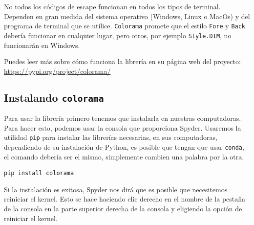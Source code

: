 \documentclass[10pt,a4paper]{article}
\begin{document}
No todos los códigos de escape funcionan en todos los tipos de terminal. Dependen en gran medida del sistema operativo (Windows, Linux o MacOs) y del programa de terminal que se utilice. \texttt{Colorama} promete que el estilo \texttt{Fore} y \texttt{Back} debería funcionar en cualquier lugar, pero otros, por ejemplo \texttt{Style.DIM}, no funcionarán en Windows.

Puedes leer más sobre cómo funciona la librería en su página web del proyecto: \\
\href{https://pypi.org/project/colorama/}{https://pypi.org/project/colorama/}

\subsection{Instalando \texttt{colorama}}
 
Para usar la librería primero tenemos que instalarla en nuestras computadoras. Para hacer esto, podemos usar la consola que proporciona Spyder. Usaremos la utilidad \lstinline|pip| para instalar las librerías necesarias, en sus computadoras, dependiendo de su instalación de Python, es posible que tengan que usar \lstinline|conda|, el comando debería ser el mismo, simplemente cambien una palabra por la otra.

\begin{lstlisting}
pip install colorama
\end{lstlisting}

Si la instalación es exitosa, Spyder nos dirá que es posible que necesitemos reiniciar el kernel. Esto se hace haciendo clic derecho en el nombre de la pestaña de la consola en la parte superior derecha de la consola y eligiendo la opción de reiniciar el kernel.
\end{document}
